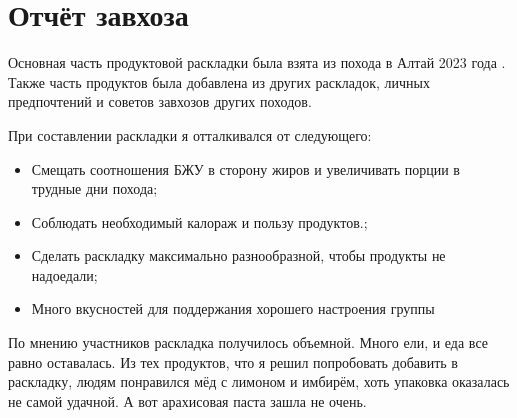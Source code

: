\section{Отчёт завхоза}
Основная часть продуктовой раскладки была взята из похода в Алтай 2023 года \cite{Snegovskaya2024}. Также часть продуктов была добавлена из других раскладок, личных предпочтений и советов завхозов других походов.

При составлении раскладки я отталкивался от следующего:
\begin{itemize}
	\item Смещать соотношения БЖУ в сторону жиров и увеличивать порции в трудные дни похода;
	\item Соблюдать необходимый калораж и пользу продуктов.;
	\item Сделать раскладку максимально разнообразной, чтобы продукты не надоедали;
	\item Много вкусностей для поддержания хорошего настроения группы
	
\end{itemize}


По мнению участников раскладка получилось объемной. Много ели, и еда все равно оставалась. Из тех продуктов, что я решил попробовать добавить в раскладку, людям понравился мёд с лимоном и имбирём, хоть упаковка оказалась не самой удачной. А вот арахисовая паста зашла не очень.

\clearpage
